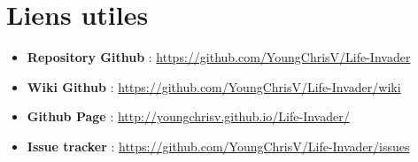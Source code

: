 \chapter*{Liens utiles}
\begin{itemize}
    \item \textbf{Repository Github} : \url{https://github.com/YoungChrisV/Life-Invader}
    \item \textbf{Wiki Github} : \url{https://github.com/YoungChrisV/Life-Invader/wiki}
    \item \textbf{Github Page} : \url{http://youngchrisv.github.io/Life-Invader/}
    \item \textbf{Issue tracker} : \url{https://github.com/YoungChrisV/Life-Invader/issues}
\end{itemize}

\tableofcontents

\clearpage


